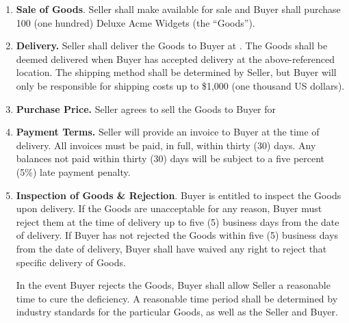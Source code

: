 \documentclass[letterpaper]{article}
\newcommand{\blank}[1]{\underline{\hspace{#1}}}
\begin{document}
    \begin{enumerate}
        \item \textbf{Sale of Goods}. Seller shall make available for sale and Buyer shall purchase 100 (one hundred) Deluxe Acme Widgets (the “Goods”).

        \item \textbf{Delivery.} Seller shall deliver the Goods to Buyer at \blank{5cm}. The Goods shall be deemed delivered when Buyer has accepted delivery at the above-referenced location. The shipping method shall be determined by Seller, but Buyer will only be responsible for shipping costs up to \$1,000 (one thousand US dollars).

        \item \textbf{Purchase Price.} Seller agrees to sell the Goods to Buyer for
        \item \textbf{Payment Terms.} Seller will provide an invoice to Buyer at the time of delivery. All invoices must be paid, in full, within thirty (30) days. Any balances not paid within thirty (30) days will be subject to a five percent (5\%) late payment penalty. 

        \item \textbf{Inspection of Goods \& Rejection}. Buyer is entitled to inspect the Goods upon delivery. If the Goods are unacceptable for any reason, Buyer must reject them at the time of delivery up to five (5) business days from the date of delivery. If Buyer has not rejected the Goods within five (5) business days from the date of delivery, Buyer shall have waived any right to reject that specific delivery of Goods. 

        In the event Buyer rejects the Goods, Buyer shall allow Seller a reasonable time to cure the deficiency. A reasonable time period shall be determined by industry standards for the particular Goods, as well as the Seller and Buyer.


\end{enumerate}
\end{document}
